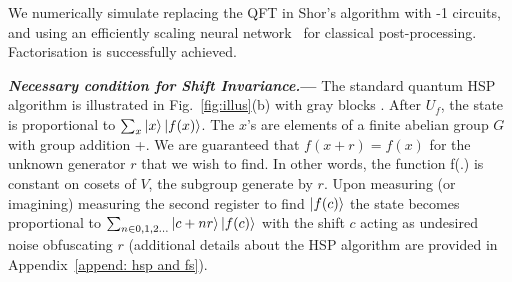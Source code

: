 \documentclass[reprint, aps, prl, superscriptaddress]{revtex4-2}
\renewcommand{\section}[1]{\par\medskip\noindent\textbf{{\textit{#1.}---}}}
\newcommand{\myqc}{\text{HP}}
\begin{document}
We numerically simulate replacing the QFT in Shor's algorithm with \myqc-1 circuits, and using an efficiently scaling neural network~\cite{zaheer2017deep} for classical post-processing. Factorisation is successfully achieved.  












\section{Necessary condition for Shift Invariance}
The standard quantum HSP algorithm is illustrated in Fig.~\ref{fig:illus}(b) with gray blocks \cite{Shor1994, Shor1997, Simon1997, Jozsa2001}.
After $U_f$, the state is proportional to $\sum_x \ket{x}\ket{f(x)}$. The $x$'s are elements of a finite abelian group $G$ with group addition +. We are guaranteed that $f(x+r)=f(x)$ for the unknown generator $r$ that we wish to find. In other words, the function f(.) is constant on cosets of $V$, the subgroup generate by $r$. Upon measuring (or imagining) measuring the second register to find $\ket{f(c)}$ the state becomes proportional to $\sum_{n\in 0,1,2...} \ket{c+nr}\ket{f(c)}$ with the shift $c$ acting as undesired noise obfuscating $r$ (additional details about the HSP algorithm are provided in
Appendix~\ref{append: hsp and fs}).
\end{document}

